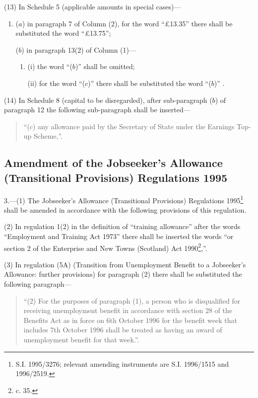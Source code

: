 \documentclass[12pt,a4paper]{article}
\begin{document}
(13) In Schedule 5 (applicable amounts in special cases)—
\begin{enumerate}\item[]
($a$) in paragraph 7 of Column (2), for the word “£13.35” there shall be substituted the word “£13.75”;

($b$) in paragraph 13(2) of Column (1)—
\begin{enumerate}\item[]
(i) the word “($b$)” shall be omitted;

(ii) for the word “($c$)” there shall be substituted the word “($b$)”%
%
.
\end{enumerate}
\end{enumerate}

(14) In Schedule 8 (capital to be disregarded), after sub-paragraph ($b$) of paragraph 12 the following sub-paragraph shall be inserted—
\begin{quotation}
“($c$) any allowance paid by the Secretary of State under the Earnings Top-up Scheme,”.
\end{quotation}


\subsection[3. Amendment of the Jobseeker’s Allowance (Transitional Provisions) Regulations 1995]{Amendment of the Jobseeker’s Allowance (Transitional Provisions) Regulations 1995}

3.—(1) The Jobseeker’s Allowance (Transitional Provisions) Regulations 1995\footnote{\frenchspacing S.I. 1995/3276; relevant amending instruments are S.I. 1996/1515 and 1996/2519.} shall be amended in accordance with the following provisions of this regulation.

(2) In regulation 1(2) in the definition of “training allowance” after the words “Employment and Training Act 1973” there shall be inserted the words “or section 2 of the Enterprise and New Towns (Scotland) Act 1990\footnote{ c. 35.},”.

(3) In regulation (5A) (Transition from Unemployment Benefit to a Jobseeker’s Allowance: further provisions) for paragraph (2) there shall be substituted the following paragraph—
\begin{quotation}
“(2) For the purposes of paragraph (1), a person who is disqualified for receiving unemployment benefit in accordance with section 28 of the Benefits Act as in force on 6th October 1996 for the benefit week that includes 7th October 1996 shall be treated as having an award of unemployment benefit for that week.”.
\end{quotation}
\end{document}
